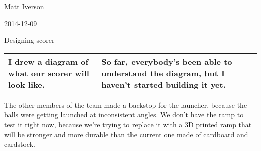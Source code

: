 Matt Iverson

2014-12-09

Designing scorer

\begin{tabular}{|p{5cm}|p{5cm}|}
 \hline
 I drew a diagram of what our scorer will look like.
 &
 So far, everybody's been able to understand the diagram, but I haven't started building it yet.
 \\
 \hline
\end{tabular}

The other members of the team made a backstop for the launcher, because the balls were getting launched at inconsistent angles. We don't have the ramp to test it right now, because we're trying to replace it with a 3D printed ramp that will be stronger and more durable than the current one made of cardboard and cardstock.
